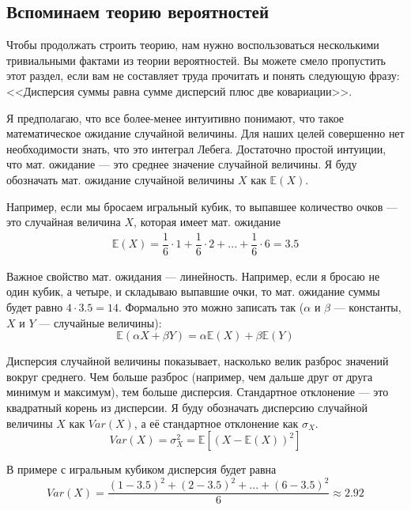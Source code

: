 \subsection{Вспоминаем теорию вероятностей}

Чтобы продолжать строить теорию, нам нужно воспользоваться не\-сколь\-ки\-ми 
тривиальными фактами из теории вероятностей. Вы можете смело пропустить этот 
раздел, если вам не составляет труда прочитать и понять следующую фразу: 
<<Дисперсия суммы равна сумме дисперсий плюс две ковариации>>.

Я предполагаю, что все более-менее интуитивно понимают, что такое 
математическое ожидание случайной величины. Для наших целей совершенно нет 
необходимости знать, что это интеграл Лебега. Достаточно простой интуиции, что 
мат. ожидание --- это среднее значение случайной величины. Я буду обозначать 
мат. ожидание случайной величины $X$ как $\mathbb{E}(X)$.

Например, если мы бросаем игральный кубик, то выпавшее количество очков --- это 
случайная величина $X$, которая имеет мат. ожидание
\begin{align*}
\mathbb{E}(X) = \dfrac{1}{6}\cdot 1 + \dfrac{1}{6}\cdot 2
+ ... + \dfrac{1}{6}\cdot 6 = 3.5
\end{align*}

Важное свойство мат. ожидания --- линейность. Например, если я бросаю не один 
кубик, а четыре, и складываю выпавшие очки, то мат. ожидание суммы будет равно 
$4 \cdot 3.5 =  14$. Формально это можно записать так ($\alpha$ и $\beta$ --- 
константы, $X$ и $Y$ --- случайные величины):
\begin{equation*}
\mathbb{E}(\alpha X + \beta Y) = \alpha\mathbb{E}(X) + \beta\mathbb{E}(Y)
\end{equation*}

Дисперсия случайной величины показывает, насколько велик разброс значений вокруг 
среднего. Чем больше разброс (например, чем дальше друг от друга минимум и 
максимум), тем больше дисперсия. Стандартное отклонение --- это квадратный 
корень из дисперсии. Я буду обозначать дисперсию случайной величины $X$ как  
$Var(X)$, а её стандартное отклонение как $\sigma_X$.
\begin{equation*}
Var(X) = \sigma_X^2 = \mathbb{E}\left[(X - \mathbb{E}(X))^2 \right]
\end{equation*}

В примере с игральным кубиком дисперсия будет равна
\begin{equation*}
Var(X) = \dfrac{(1 - 3.5)^2 + (2 - 3.5)^2 + ... + (6 - 3.5)^2}{6} \approx 2.92
\end{equation*}


